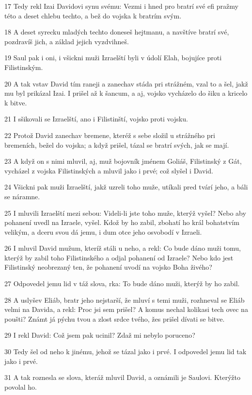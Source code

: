 \par 17 Tedy rekl Izai Davidovi synu svému: Vezmi i hned pro bratrí své efi pražmy této a deset chlebu techto, a bež do vojska k bratrím svým.
\par 18 A deset syrecku mladých techto doneseš hejtmanu, a navštíve bratrí své, pozdravíš jich, a základ jejich vyzdvihneš.
\par 19 Saul pak i oni, i všickni muži Izraelští byli v údolí Elah, bojujíce proti Filistinským.
\par 20 A tak vstav David tím raneji a zanechav stáda pri strážném, vzal to a šel, jakž mu byl prikázal Izai. I prišel až k šancum, a aj, vojsko vycházelo do šiku a kricelo k bitve.
\par 21 I sšikovali se Izraelští, ano i Filistinští, vojsko proti vojsku.
\par 22 Protož David zanechav bremene, kteréž s sebe složil u strážného pri bremeních, bežel do vojska; a když prišel, tázal se bratrí svých, jak se mají.
\par 23 A když on s nimi mluvil, aj, muž bojovník jménem Goliáš, Filistinský z Gát, vycházel z vojska Filistinských a mluvil jako i prvé; což slyšel i David.
\par 24 Všickni pak muži Izraelští, jakž uzreli toho muže, utíkali pred tvárí jeho, a báli se náramne.
\par 25 I mluvili Izraelští mezi sebou: Videli-li jste toho muže, kterýž vyšel? Nebo aby pohanení uvedl na Izraele, vyšel. Kdož by ho zabil, zbohatí ho král bohatstvím velikým, a dceru svou dá jemu, i dum otce jeho osvobodí v Izraeli.
\par 26 I mluvil David mužum, kteríž stáli u neho, a rekl: Co bude dáno muži tomu, kterýž by zabil toho Filistinského a odjal pohanení od Izraele? Nebo kdo jest Filistinský neobrezaný ten, že pohanení uvodí na vojsko Boha živého?
\par 27 Odpovedel jemu lid v táž slova, rka: To bude dáno muži, kterýž by ho zabil.
\par 28 A uslyšev Eliáb, bratr jeho nejstarší, že mluví s temi muži, rozhneval se Eliáb velmi na Davida, a rekl: Proc jsi sem prišel? A komus nechal kolikasi tech ovec na poušti? Známt já pýchu tvou a zlost srdce tvého, žes prišel dívati se bitve.
\par 29 I rekl David: Což jsem pak ucinil? Zdaž mi nebylo poruceno?
\par 30 Tedy šel od neho k jinému, jehož se tázal jako i prvé. I odpovedel jemu lid tak jako i prvé.
\par 31 A tak roznesla se slova, kteráž mluvil David, a oznámili je Saulovi. Kterýžto povolal ho.
